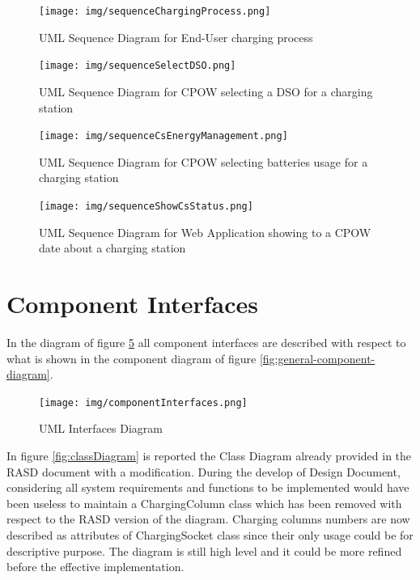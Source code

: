 \documentclass[a4paper]{report}
\begin{document}
\begin{landscape}
\begin{figure}[hp]
\centering
\texttt{[image: img/sequenceChargingProcess.png]}
\caption{UML Sequence Diagram for End-User charging process}
\label{fig:seq-charge}
\end{figure}
\end{landscape}

\begin{landscape}
\begin{figure}[hp]
\centering
\texttt{[image: img/sequenceSelectDSO.png]}
\caption{UML Sequence Diagram for CPOW selecting a DSO for a charging station}
\label{fig:seq-selectDSO}
\end{figure}
\end{landscape}

\begin{landscape}
\begin{figure}[hp]
\centering
\texttt{[image: img/sequenceCsEnergyManagement.png]}
\caption{UML Sequence Diagram for CPOW selecting batteries usage for a charging station}
\label{fig:seq-energyManagement}
\end{figure}
\end{landscape}

\begin{landscape}
\begin{figure}[hp]
\centering
\texttt{[image: img/sequenceShowCsStatus.png]}
\caption{UML Sequence Diagram for Web Application showing to a CPOW date about a charging station}
\label{fig:seq-csStatus}
\end{figure}
\end{landscape}

\section{Component Interfaces}
In the diagram of figure \ref{fig:componentInterfaces} all component interfaces are described with respect to what is shown in the component diagram of figure \ref{fig:general-component-diagram}.

\begin{figure}[htp]
\texttt{[image: img/componentInterfaces.png]}
\caption{UML Interfaces Diagram}
\label{fig:componentInterfaces}
\end{figure}

In figure \ref{fig:classDiagram} is reported the Class Diagram already provided in the RASD document with a modification. During the develop of Design Document, considering all system requirements and functions to be implemented would have been useless to maintain a ChargingColumn class which has been removed with respect to the RASD version of the diagram. Charging columns numbers are now described as attributes of ChargingSocket class since their only usage could be for descriptive purpose. The diagram is still high level and it could be more refined before the effective implementation.
\end{document}
